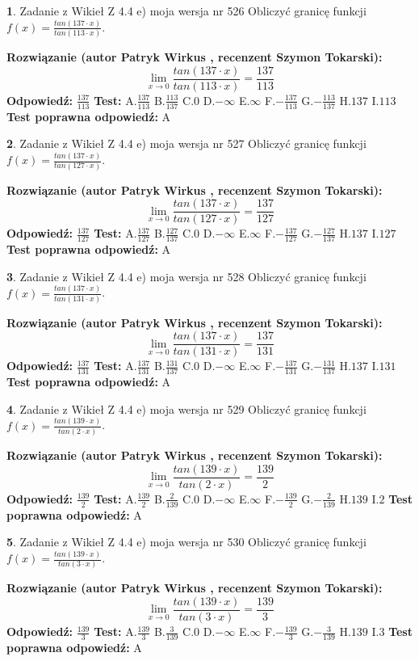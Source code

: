 \documentclass[12pt, a4paper]{article}
\theoremstyle{definition} %
\newtheorem{zad}{}
\newcommand{\zadStart}[1]{\begin{zad}#1\newline}
\newcommand{\zadStop}{\end{zad}}
\newcommand{\rozwStart}[2]{\noindent \textbf{Rozwiązanie (autor #1 , recenzent #2): }\newline}
\newcommand{\rozwStop}{\newline}
\newcommand{\odpStart}{\noindent \textbf{Odpowiedź:}\newline}
\newcommand{\odpStop}{\newline}
\newcommand{\testStart}{\noindent \textbf{Test:}\newline}
\newcommand{\testStop}{\newline}
\newcommand{\kluczStart}{\noindent \textbf{Test poprawna odpowiedź:}\newline}
\newcommand{\kluczStop}{\newline}
\begin{document}
\zadStart{Zadanie z Wikieł Z 4.4 e) moja wersja nr 526}
Obliczyć granicę funkcji $f(x)=\frac{tan(137\cdot x)}{tan(113\cdot x)}$.
\zadStop
\rozwStart{Patryk Wirkus}{Szymon Tokarski}
$$\lim\limits_{x\to 0}\frac{tan(137\cdot x)}{tan(113\cdot x)}=
\frac{137}{113}$$
\rozwStop
\odpStart
$\frac{137}{113}$
\odpStop
\testStart
A.$\frac{137}{113}$
B.$\frac{113}{137}$
C.$0$
D.$-\infty$
E.$\infty$
F.$-\frac{137}{113}$
G.$-\frac{113}{137}$
H.$137$
I.$113$
\testStop
\kluczStart
A
\kluczStop



\zadStart{Zadanie z Wikieł Z 4.4 e) moja wersja nr 527}
Obliczyć granicę funkcji $f(x)=\frac{tan(137\cdot x)}{tan(127\cdot x)}$.
\zadStop
\rozwStart{Patryk Wirkus}{Szymon Tokarski}
$$\lim\limits_{x\to 0}\frac{tan(137\cdot x)}{tan(127\cdot x)}=
\frac{137}{127}$$
\rozwStop
\odpStart
$\frac{137}{127}$
\odpStop
\testStart
A.$\frac{137}{127}$
B.$\frac{127}{137}$
C.$0$
D.$-\infty$
E.$\infty$
F.$-\frac{137}{127}$
G.$-\frac{127}{137}$
H.$137$
I.$127$
\testStop
\kluczStart
A
\kluczStop



\zadStart{Zadanie z Wikieł Z 4.4 e) moja wersja nr 528}
Obliczyć granicę funkcji $f(x)=\frac{tan(137\cdot x)}{tan(131\cdot x)}$.
\zadStop
\rozwStart{Patryk Wirkus}{Szymon Tokarski}
$$\lim\limits_{x\to 0}\frac{tan(137\cdot x)}{tan(131\cdot x)}=
\frac{137}{131}$$
\rozwStop
\odpStart
$\frac{137}{131}$
\odpStop
\testStart
A.$\frac{137}{131}$
B.$\frac{131}{137}$
C.$0$
D.$-\infty$
E.$\infty$
F.$-\frac{137}{131}$
G.$-\frac{131}{137}$
H.$137$
I.$131$
\testStop
\kluczStart
A
\kluczStop



\zadStart{Zadanie z Wikieł Z 4.4 e) moja wersja nr 529}
Obliczyć granicę funkcji $f(x)=\frac{tan(139\cdot x)}{tan(2\cdot x)}$.
\zadStop
\rozwStart{Patryk Wirkus}{Szymon Tokarski}
$$\lim\limits_{x\to 0}\frac{tan(139\cdot x)}{tan(2\cdot x)}=
\frac{139}{2}$$
\rozwStop
\odpStart
$\frac{139}{2}$
\odpStop
\testStart
A.$\frac{139}{2}$
B.$\frac{2}{139}$
C.$0$
D.$-\infty$
E.$\infty$
F.$-\frac{139}{2}$
G.$-\frac{2}{139}$
H.$139$
I.$2$
\testStop
\kluczStart
A
\kluczStop



\zadStart{Zadanie z Wikieł Z 4.4 e) moja wersja nr 530}
Obliczyć granicę funkcji $f(x)=\frac{tan(139\cdot x)}{tan(3\cdot x)}$.
\zadStop
\rozwStart{Patryk Wirkus}{Szymon Tokarski}
$$\lim\limits_{x\to 0}\frac{tan(139\cdot x)}{tan(3\cdot x)}=
\frac{139}{3}$$
\rozwStop
\odpStart
$\frac{139}{3}$
\odpStop
\testStart
A.$\frac{139}{3}$
B.$\frac{3}{139}$
C.$0$
D.$-\infty$
E.$\infty$
F.$-\frac{139}{3}$
G.$-\frac{3}{139}$
H.$139$
I.$3$
\testStop
\kluczStart
A
\kluczStop
\end{document}
